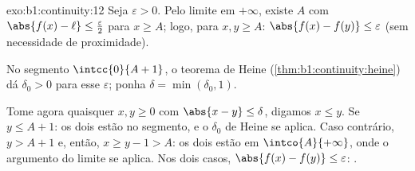 \begin{solution}{exo:b1:continuity:12}
Seja $\varepsilon > 0$. Pelo limite em $+\infty$, existe $A$ com
$\abs{f(x) - \ell} \leq \frac\varepsilon2$ para $x \geq A$; logo, para
$x, y \geq A$: $\abs{f(x) - f(y)} \leq \varepsilon$ (sem necessidade
de proximidade).

No segmento $\intcc{0}{A + 1}$, o teorema de Heine
(\cref{thm:b1:continuity:heine}) dá $\delta_0 > 0$ para esse
$\varepsilon$; ponha $\delta = \min(\delta_0, 1)$.

Tome agora quaisquer $x, y \geq 0$ com $\abs{x - y} \leq \delta$, digamos $x
\leq y$. Se $y \leq A + 1$: os dois estão no segmento, e o
$\delta_0$ de Heine se aplica. Caso contrário, $y > A + 1$ e, então, $x \geq y - 1 >
A$: os dois estão em $\intco{A}{+\infty}$, onde o argumento do limite
se aplica. Nos dois casos, $\abs{f(x) - f(y)} \leq \varepsilon$: .
\end{solution}

